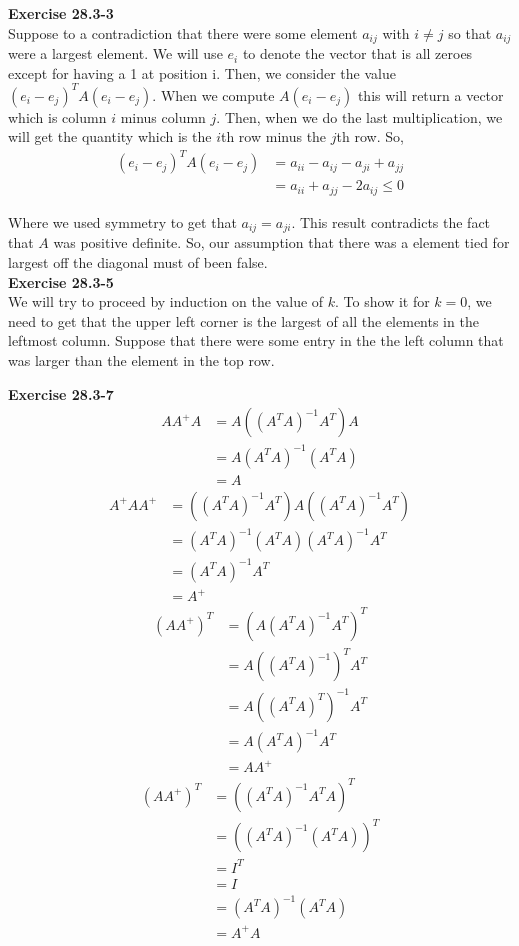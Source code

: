 \documentclass{article}
\begin{document}
\noindent\textbf{Exercise 28.3-3}\\
Suppose to a contradiction that there were some element $a_{ij}$ with $i\neq j$ so that $a_{ij}$ were a largest element. We will use $e_i$ to denote the vector that is all zeroes except for having a 1 at position i. Then, we consider the value $(e_i-e_j)^T A (e_i-e_j)$. When we compute $A(e_i-e_j)$ this will return a vector which is column $i$ minus column $j$. Then, when we do the last multiplication, we will get the quantity which is the $i$th row minus the $j$th row. So, 
\begin{align*}
(e_i-e_j)^T A (e_i-e_j) &= a_{ii} - a_{ij} - a_{ji}  +a_{jj}\\
&=a_{ii} + a_{jj} - 2 a_{ij}\le0
\end{align*}

Where we used symmetry to get that $a_{ij} =a_{ji}$. This result contradicts the fact that $A$ was positive definite. So, our assumption that there was a element tied for largest off the diagonal must of been false.\\



\noindent\textbf{Exercise 28.3-5}\\
We will try to proceed by induction on the value of $k$. To show it for $k=0$, we need to get that the upper left corner is the largest of all the elements in the leftmost column. Suppose that there were some entry in the the left column that was larger than the element in the top row.



\noindent\textbf{Exercise 28.3-7}\\

\begin{align*}
AA^+A &= A ((A^TA)^{-1}A^T)A\\
&= A(A^TA)^{-1}(A^T A)\\
&= A
\end{align*}
\begin{align*}
A^+AA^+ &=  ((A^TA)^{-1}A^T)A((A^TA)^{-1}A^T)\\
 &= (A^TA)^{-1} (A^T A)(A^TA)^{-1} A^T\\ 
 &= (A^TA)^{-1} A^T\\
 &= A^+
\end{align*}
\begin{align*}
(AA^+)^T &= (A (A^TA)^{-1}A^T)^T\\
&= A ((A^T A)^{-1})^T A^T\\
&= A((A^T A)^T)^{-1} A^T\\
&= A(A^T A)^{-1} A^T\\
&= A A^+
\end{align*}
\begin{align*}
(AA^+)^T &= ((A^TA)^{-1}A^T A)^T\\
&= ((A^T A)^{-1}(A^T A))^T \\
&= I^T\\
&= I\\
&= (A^T A)^{-1} (A^TA)\\
&= A^+ A
\end{align*}
\end{document}
